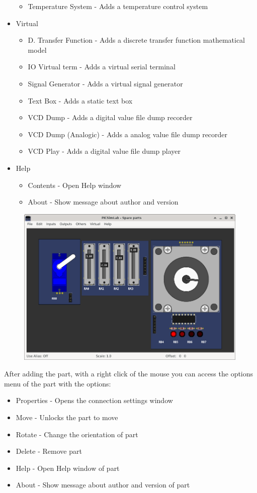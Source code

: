 \begin{itemize}
\begin{itemize}
   \item Temperature System - Adds a temperature control system
  \end{itemize}
\item{Virtual}
  \begin{itemize}
  \item D. Transfer Function - Adds a discrete transfer function mathematical model
  \item IO Virtual term - Adds a virtual serial terminal 
  \item Signal Generator - Adds a virtual signal generator
  \item Text Box - Adds a static text box
  \item VCD Dump - Adds a digital value file dump recorder 
  \item VCD Dump (Analogic) - Adds a analog value file dump recorder  
  \item VCD Play - Adds a digital value file dump player  
  \end{itemize}   
 \item Help
 \begin{itemize}
 \item Contents - Open Help window
 \item About - Show message about author and version
\end{itemize}
\end{itemize}


\begin{figure}[H]
\center
\includegraphics[width=0.99\textwidth]{img/spare.png} 
\end{figure} 

After adding the part, with a right click of the mouse you can access the options menu of the part with the options:
\begin{itemize}
 \item Properties - Opens the connection settings window
 \item Move - Unlocks the part to move
 \item Rotate - Change the orientation of part
 \item Delete - Remove part
 \item Help - Open Help window of part
 \item About - Show message about author and version of part
\end{itemize}


